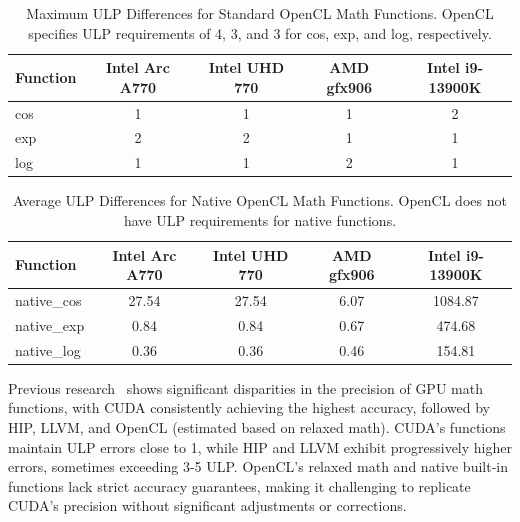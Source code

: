 \documentclass[Afour,sageh,times]{sagej}
\newcommand{\mycite}[1]{\citep{#1}}
\begin{document}
\begin{table}
\centering
\large
\begin{tabular}{lcccc}
\hline
\textbf{Function} & \textbf{Intel Arc A770} & \textbf{Intel UHD 770} & \textbf{AMD gfx906} & \textbf{Intel i9-13900K} \\
\hline
cos               & 1                       & 1                      & 1                   & 2                         \\
exp               & 2                       & 2                      & 1                   & 1                         \\
log               & 1                       & 1                      & 2                   & 1                         \\
\hline
\end{tabular}
\caption{Maximum ULP Differences for Standard OpenCL Math Functions. OpenCL specifies ULP requirements of 4, 3, and 3 for cos, exp, and log, respectively.}
\label{ulp-math}

\end{table}

\begin{table}
\centering
\large
\begin{tabular}{lcccc}
\hline
\textbf{Function} & \textbf{Intel Arc A770} & \textbf{Intel UHD 770} & \textbf{AMD gfx906} & \textbf{Intel i9-13900K} \\
\hline
native\_cos& 27.54                   & 27.54                  & 6.07                & 1084.87                   \\
native\_exp& 0.84                    & 0.84                   & 0.67                & 474.68                    \\
native\_log& 0.36                    & 0.36                   & 0.46                & 154.81                    \\
\hline
\end{tabular}
\caption{Average ULP Differences for Native OpenCL Math Functions. OpenCL does not have ULP requirements for native functions.}
\label{ulp-fast-math}

\end{table}

Previous research~\mycite{ulp-comparisons-paper} shows significant disparities in the precision of GPU math functions, with CUDA consistently achieving the highest accuracy, followed by HIP, LLVM, and OpenCL (estimated based on relaxed math). CUDA’s functions maintain ULP errors close to 1, while HIP and LLVM exhibit progressively higher errors, sometimes exceeding 3-5 ULP. OpenCL’s relaxed math and native built-in functions lack strict accuracy guarantees, making it challenging to replicate CUDA’s precision without significant adjustments or corrections.
\end{document}
